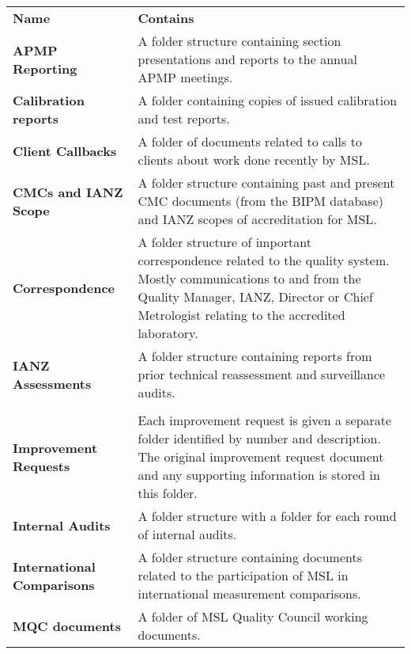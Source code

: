 {\renewcommand*{\arraystretch}{1.4}
\begin{longtable}{p{14.07em}p{25em}}
	\rowcolor[rgb]{ 0,  0,  0} 
	\textcolor[rgb]{ 1,  1,  1}{\textbf{Name}} & 
	\textcolor[rgb]{ 1,  1,  1}{\textbf{Contains}} \\

\textbf{APMP Reporting} & A folder structure containing section presentations and reports to the annual APMP meetings. \\

\textbf{Calibration reports} & A folder containing copies of issued calibration and test reports. \\

\textbf{Client Callbacks} & A folder of documents related to calls to clients about work done recently by MSL. \\

\textbf{CMCs and IANZ Scope} & A folder structure containing past and present CMC documents (from the BIPM database) and IANZ scopes of accreditation for MSL. \\

\textbf{Correspondence} & A folder structure of important correspondence related to the quality system. Mostly communications to and from the Quality Manager, IANZ, Director or Chief Metrologist relating to the accredited laboratory. \\

\textbf{IANZ Assessments} & A folder structure containing reports from prior technical reassessment and surveillance audits. \\

\\

\textbf{Improvement Requests} & Each improvement request is given a separate folder identified by number and description.  The original improvement request document and any supporting information is stored in this folder. \\

\textbf{Internal Audits} & A folder structure with a folder for each round of internal audits. \\

\textbf{International Comparisons} & A folder structure containing documents related to the participation of MSL in international measurement comparisons. \\

\textbf{MQC documents} & A folder of MSL Quality Council working documents. \\


\end{longtable}}
